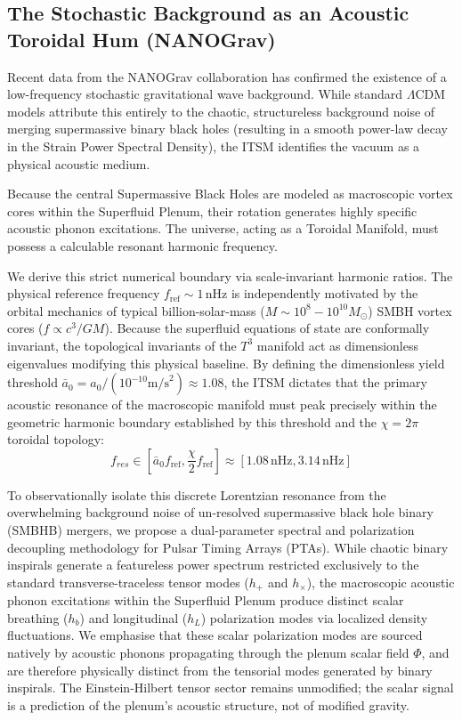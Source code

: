 \documentclass[aps,prd,10pt,twocolumn,superscriptaddress,nofootinbib,floatfix]{revtex4-2}
\begin{document}
\subsection{The Stochastic Background as an Acoustic Toroidal Hum (NANOGrav)}
Recent data from the NANOGrav collaboration \cite{nanograv} has confirmed the existence of a low-frequency stochastic gravitational wave background. While standard $\Lambda$CDM models attribute this entirely to the chaotic, structureless background noise of merging supermassive binary black holes (resulting in a smooth power-law decay in the Strain Power Spectral Density), the ITSM identifies the vacuum as a physical acoustic medium. 

Because the central Supermassive Black Holes are modeled as macroscopic vortex cores within the Superfluid Plenum, their rotation generates highly specific acoustic phonon excitations. The universe, acting as a Toroidal Manifold, must possess a calculable resonant harmonic frequency.

We derive this strict numerical boundary via scale-invariant harmonic ratios. The physical reference frequency $f_{\text{ref}} \sim 1\,\text{nHz}$ is independently motivated by the orbital mechanics of typical billion-solar-mass ($M \sim 10^8 - 10^{10} M_\odot$) SMBH vortex cores ($f \propto c^3/GM$). Because the superfluid equations of state are conformally invariant, the topological invariants of the $T^3$ manifold act as dimensionless eigenvalues modifying this physical baseline. By defining the dimensionless yield threshold $\bar{a}_0 = a_0 / (10^{-10} \text{m/s}^2) \approx 1.08$, the ITSM dictates that the primary acoustic resonance of the macroscopic manifold must peak precisely within the geometric harmonic boundary established by this threshold and the $\chi=2\pi$ toroidal topology:
\begin{equation}
f_{res} \in [\bar{a}_0 f_{\text{ref}}, \frac{\chi}{2} f_{\text{ref}}] \approx [1.08\,\text{nHz}, 3.14\,\text{nHz}]
\end{equation}

To observationally isolate this discrete Lorentzian resonance from the overwhelming background noise of un-resolved supermassive black hole binary (SMBHB) mergers, we propose a dual-parameter spectral and polarization decoupling methodology for Pulsar Timing Arrays (PTAs). While chaotic binary inspirals generate a featureless power spectrum restricted exclusively to the standard transverse-traceless tensor modes ($h_+$ and $h_{\times}$), the macroscopic acoustic phonon excitations within the Superfluid Plenum produce distinct scalar breathing ($h_b$) and longitudinal ($h_L$) polarization modes via localized density fluctuations. We emphasise that these scalar polarization modes are sourced natively by acoustic phonons propagating through the plenum scalar field $\Phi$, and are therefore physically distinct from the tensorial modes generated by binary inspirals. The Einstein-Hilbert tensor sector remains unmodified; the scalar signal is a prediction of the plenum's acoustic structure, not of modified gravity.
\end{document}
